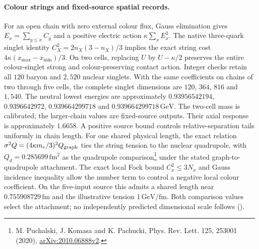 \paragraph{Colour strings and fixed-source spatial records.}
For an open chain with zero external colour flux, Gauss elimination gives
$E_x=\sum_{y\leq x}C_y$ and a positive electric action
$\kappa\sum_x E_x^2$. The native three-quark singlet identity
$C_X^2=2n_X(3-n_X)/3$ implies the exact string cost
$4\kappa(x_{\max}-x_{\min})/3$.
On two cells, replacing $U$ by $U-\kappa/2$ preserves the entire
colour-singlet strong and colour-preserving contact action. Integer
checks retain all $120$ baryon and $2{,}520$ nuclear singlets.
With the same coefficients on chains of two through five cells, the
complete singlet dimensions are $120$, $364$, $816$ and $1{,}540$.
The neutral lowest energies are approximately
$0.93956542194$, $0.9396642972$, $0.939664299718$ and
$0.939664299718\,\mathrm{GeV}$. The two-cell mass is calibrated;
the larger-chain values are fixed-source outputs. Their axial response
is approximately $1.6658$. A positive source bound controls
relative-separation tails uniformly in chain length.
For one shared physical length, the exact relation
$\sigma^2Q=(4\kappa m_e/3)^2Q_{\rm graph}$ ties the string tension to
the nuclear quadrupole, with $Q_d=0.285699\,\mathrm{fm}^2$ as the
quadrupole comparison\footnote{M. Puchalski, J. Komasa and K. Pachucki,
Phys. Rev. Lett. 125, 253001 (2020),
\href{https://arxiv.org/abs/2010.06888v2}{arXiv:2010.06888v2}.}
under the stated graph-to-quadrupole attachment. The exact local Fock bound $C_x^2\leq3N_x$ and Gauss incidence inequality
allow the number term to control a negative local colour coefficient.
On the five-input source this admits a shared length near
$0.755908729\,\mathrm{fm}$ and the illustrative tension
$1\,\mathrm{GeV/fm}$. Both comparison values select the attachment;
no independently predicted dimensional scale follows
().


